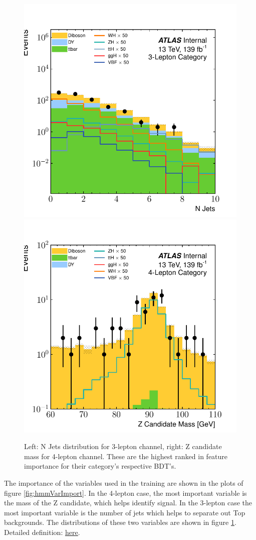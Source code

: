 
\begin{figure}[htpb]
  \centering
  \includegraphics[height=0.48\textwidth]{figures/hmm/nJets/histo-3lep-nJets.pdf}
  \includegraphics[height=0.48\textwidth]{figures/hmm/zCand/histo-4lep-auxDilep_mass.pdf}
  \caption{Left: N Jets distribution for 3-lepton channel, right: Z candidate mass for 4-lepton channel. These are the highest ranked in feature importance for their category's respective BDT's.}
    \label{fig:hmmImpVars}
\end{figure}

The importance of the variables used in the training are shown in the plots of figure \ref{fig:hmmVarImport}.
In the 4-lepton case, the most important variable is the mass of the Z candidate, which helps identify signal.
In the 3-lepton case the most important variable is the number of jets which helps to separate out Top backgrounds.
The distributions of these two variables are shown in figure \ref{fig:hmmImpVars}.
Detailed definition: \href{https://scikit-learn.org/stable/modules/feature_selection.html}{\underline{here}}.

